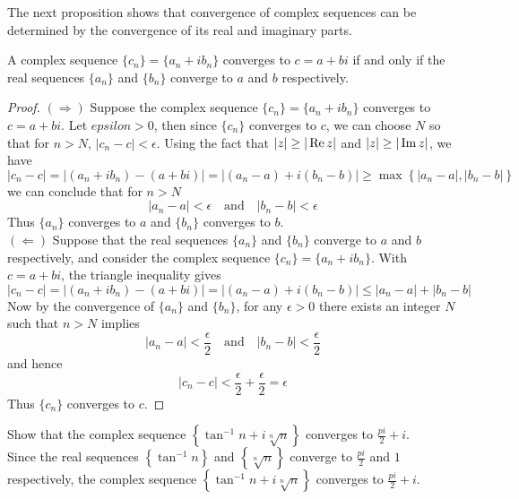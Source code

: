 \documentclass[handout]{ximera}
\begin{document}
The next proposition shows that convergence of complex sequences can be determined by the convergence of its real and imaginary parts.

\begin{proposition}
A complex sequence $\{c_n\} = \{a_n + ib_n\}$ converges to $c = a+bi$ if and only if the real 
sequences $\{a_n\}$ and $\{b_n\}$ converge to $a$ and $b$ respectively.
\end{proposition}
\begin{proof}
$\left(\Rightarrow\right)$ \; Suppose the complex sequence $\{c_n\} = \{a_n + ib_n\}$ converges to $c = a+bi$.
Let $epsilon >0$, then since $\{c_n\}$ converges to $c$, we can choose $N$ so that for $n>N$, $|c_n - c| < \epsilon$.
Using the fact that $|z| \geq |\operatorname{Re} z|$ and $|z| \geq |\operatorname{Im} z|$, we have 
\[
|c_n - c| = |(a_n + ib_n) - (a+bi)| = |(a_n -a) + i(b_n -b)| \geq \max\left\{|a_n-a|, |b_n -b|\right\}
\]
we can conclude that for $n>N$
\[
|a_n-a| < \epsilon \quad \text{and} \quad  |b_n -b| < \epsilon
\]
Thus $\{a_n\}$ converges to $a$ and $\{b_n\}$ converges to $b$.\\
$\left(\Leftarrow\right)$ Suppose that the real sequences $\{a_n\}$ and $\{b_n\}$ converge to $a$ and $b$ respectively, 
and consider the complex sequence $\{c_n\} = \{a_n + ib_n\}$. With $c = a+bi$, the triangle inequality gives
\[
|c_n - c| = |(a_n + ib_n) - (a+bi)| = |(a_n -a) + i(b_n -b)| \leq |a_n-a|+ |b_n -b|
\]
Now by the convergence of $\{a_n\}$ and $\{b_n\}$, for any $\epsilon >0$ there exists an integer $N$ such that $n>N$ implies
\[
|a_n-a| < \frac{\epsilon}{2} \quad \text{and} \quad  |b_n -b| < \frac{\epsilon}{2}
\]
and hence
\[
|c_n-c| < \frac{\epsilon}{2}+\frac{\epsilon}{2}= \epsilon 
\]
Thus $\{c_n\}$ converges to $c$.
\end{proof}

\begin{example}
Show that the complex sequence $\displaystyle \left\{\tan^{-1} n + i\sqrt[n]n\right\}$ converges to $\displaystyle \frac{pi}{2} + i$.\\
Since the real sequences $\displaystyle \left\{\tan^{-1} n\right\}$ and $\displaystyle \left\{\sqrt[n]n\right\}$ converge to 
$\displaystyle \frac{pi}{2}$ and $1$ respectively, the complex sequence 
$\displaystyle \left\{\tan^{-1} n + i\sqrt[n]n\right\}$ converges to $\displaystyle \frac{pi}{2} + i$.
\end{example}
\end{document}
